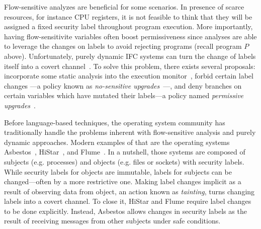 
Flow-sensitive analyzes are beneficial for some scenarios. In presence of scarce
resources, for instance CPU registers, it is not feasible to think that they
will be assigned a fixed security label throughout program execution. More
importantly, having flow-sensitivite variables often boost permissiveness since
analyses are able to leverage the changes on labels to avoid rejecting programs
(recall program $P$ above). Unfortunately, purely dynamic IFC systems can turn
the change of labels itself into a covert channel~\citep{Russo:2010}. To solve
this problem, there exists several proposals: incorporate some static analysis
into the execution monitor~\citep{Russo:2010}, forbid certain label changes ---a
policy known as \emph{no-sensitive upgrades}~\citep{Austin:Flanagan:PLAS10}---,
and deny branches on certain variables which have mutated their labels---a
policy named \emph{permissive upgrades}~\citep{Austin:Flanagan:PLAS10}. 

Before language-based techniques, the operating system community has
traditionally handle the problems inherent with flow-sensitive analysis and
purely dynamic approaches. Modern examples of that are the operating systems
Asbestos~\citep{Efstathopoulos:2005}, HiStar~\citep{zeldovich:histar}, and
Flume~\citep{krohn:flume}. In a nutshell, those systems are composed of subjects
(e.g. processes) and objects (e.g. files or sockets) with security labels. While
security labels for objects are immutable, labels for subjects can be
changed---often by a more restrictive one. Making label changes implicit as a
result of observing data from object, an action known as \emph{tainting}, turns
changing labels into a covert channel. To close it, HiStar and Flume require
label changes to be done explicitly. Instead, Asbestos allows changes in 
security labels as the result of receiving messages from other subjects  
under safe conditions.








